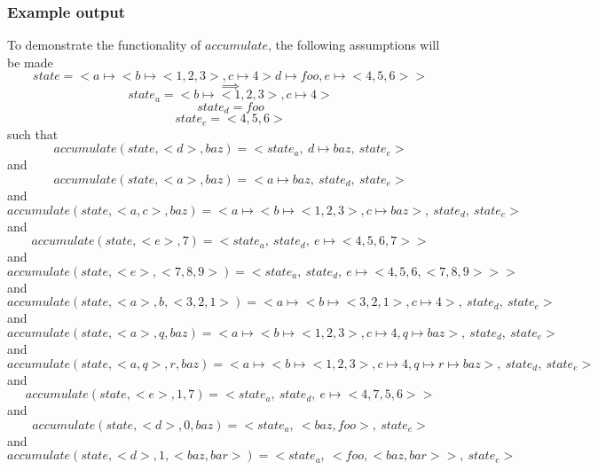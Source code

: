 \documentclass[../main.tex]{subfiles}
\begin{document}
\subsubsection{Example output}
To demonstrate the functionality of $accumulate$, the following assumptions will be made
$$state = <a \mapsto <b \mapsto <1, 2, 3>, c \mapsto 4> d \mapsto foo, e \mapsto <4, 5, 6>>$$
$$\implies$$
$$state_{a} = <b \mapsto <1, 2, 3>, c \mapsto 4>$$
$$state_{d} = foo$$
$$state_{e} = <4, 5, 6>$$
such that
$$accumulate(state, <d>, baz) = <state_{a}, \ d \mapsto baz, \ state_{e}>$$
and
$$accumulate(state, <a>, baz) = <a \mapsto baz, \ state_{d}, \ state_{e}>$$
and
$$accumulate(state, <a, c>, baz) = <a \mapsto <b \mapsto <1, 2, 3>, c \mapsto baz>, \ state_{d}, \ state_{e}>$$
and
$$accumulate(state, <e>, 7) = <state_{a}, \ state_{d}, \ e \mapsto <4, 5, 6, 7>>$$
and
$$accumulate(state, <e>, <7, 8, 9>) = <state_{a}, \ state_{d}, \ e \mapsto <4, 5, 6, <7, 8, 9>>>$$
and
$$accumulate(state, <a>, b, <3, 2, 1>) = <a \mapsto <b \mapsto <3, 2, 1>, c \mapsto 4>, \ state_{d}, \ state_{e}>$$
and
$$accumulate(state, <a>, q, baz) = <a \mapsto <b \mapsto <1, 2, 3>, c \mapsto 4, q \mapsto baz>, \ state_{d}, \ state_{e}>$$
and
$$accumulate(state, <a, q>, r, baz) = <a \mapsto <b \mapsto <1, 2, 3>, c \mapsto 4, q \mapsto r \mapsto baz>, \ state_{d}, \ state_{e}>$$
and
$$accumulate(state, <e>, 1, 7) = <state_{a}, \ state_{d}, \ e \mapsto <4, 7, 5, 6>>$$
and
$$accumulate(state, <d>, 0, baz) = <state_{a}, \ <baz, foo>, \ state_{e}>$$
and
$$accumulate(state, <d>, 1, <baz, bar>) = <state_{a}, \ <foo, <baz, bar>>, \ state_{e}>$$
\end{document}
